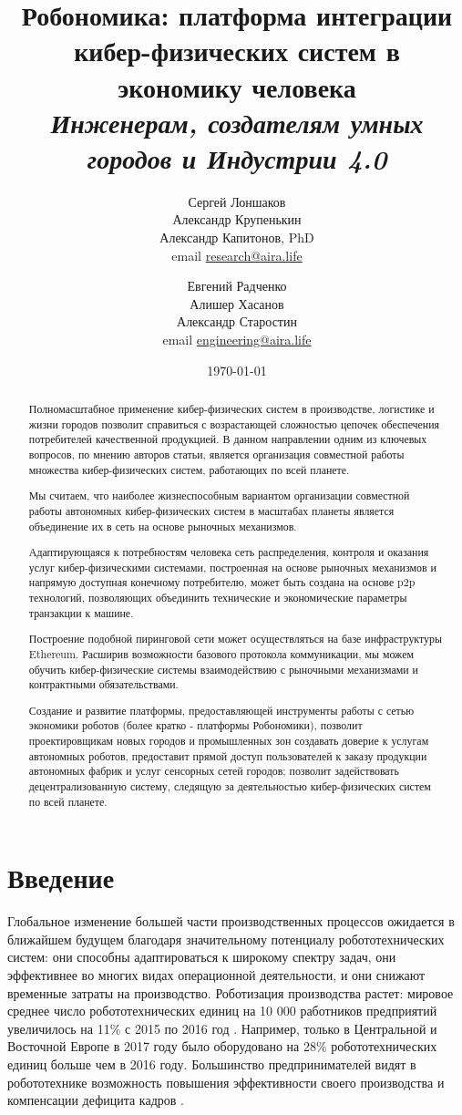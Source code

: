 \documentclass{article}
\title{Робономика: платформа интеграции кибер-физических систем в экономику человека \\ \small
\textit{Инженерам, создателям умных городов и Индустрии 4.0}}
\date{\today}
\author{Сергей Лоншаков \\ Александр Крупенькин \\ Александр Капитонов, PhD \\ email \href{mailto:research@aira.life}{research@aira.life} \and Евгений Радченко \\ Алишер Хасанов \\ Александр Старостин \\ email \href{mailto:engineering@aira.life}{engineering@aira.life} }
\begin{document}
\maketitle
 
\begin{abstract}
Полномасштабное применение кибер-физических систем в производстве, логистике и жизни городов позволит справиться с возрастающей сложностью цепочек обеспечения потребителей качественной продукцией. В данном направлении одним из ключевых вопросов, по мнению авторов статьи, является организация совместной работы множества кибер-физических систем, работающих по всей планете. 

Мы считаем, что наиболее жизнеспособным вариантом организации совместной работы автономных кибер-физических систем в масштабах планеты является объединение их в сеть на основе рыночных механизмов.

Адаптирующаяся к потребностям человека сеть распределения, контроля и оказания услуг кибер-физическими системами, построенная на основе рыночных механизмов и напрямую доступная конечному потребителю, может быть создана на основе p2p технологий, позволяющих объединить технические и экономические параметры транзакции к машине.

Построение подобной пиринговой сети может осуществляться на базе инфраструктуры Ethereum. Расширив возможности базового протокола коммуникации, мы можем обучить кибер-физические системы взаимодействию с рыночными механизмами и контрактными обязательствами.

Создание и развитие платформы, предоставляющей инструменты работы с сетью экономики роботов (более кратко - платформы Робономики), позволит проектировщикам новых городов и промышленных зон создавать доверие к услугам автономных роботов, предоставит прямой доступ пользователей к заказу продукции автономных фабрик и услуг сенсорных сетей городов; позволит задействовать децентрализованную систему, следящую за деятельностью кибер-физических систем по всей планете.
\end{abstract}

\newpage
\tableofcontents
\newpage
\section{Введение}
Глобальное изменение большей части производственных процессов ожидается в ближайшем будущем \cite{Pedersen2016RobotDeployment} благодаря значительному потенциалу робототехнических систем: они способны адаптироваться \cite{Stock2016Opportunities4.0} к широкому спектру задач, они эффективнее во многих видах операционной деятельности, и они снижают временные затраты на производство. Роботизация производства растет: мировое среднее число робототехнических единиц на 10 000 работников предприятий увеличилось на 11\% с 2015 по 2016 год \cite{2018RobotRobotics.}. Например, только в Центральной и Восточной Европе в 2017 году было оборудовано на 28\% \cite{2018EnterFactories} робототехнических единиц больше чем в 2016 году. Большинство предпринимателей видят в робототехнике возможность повышения эффективности своего производства и компенсации дефицита кадров \cite{2018EnterFactories}.
\end{document}
